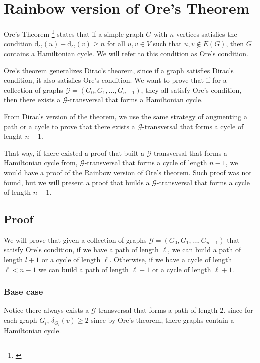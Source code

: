 
\chapter{Rainbow version of Ore's Theorem}

Ore's Theorem \footnote{\cite{Ore_1960}} states that if a simple graph $G$ with $n$ vertices satisfies the condition
$\text{d}_G(u) + \text{d}_G(v) \geq n$ for all $u, v \in V$ such that ${u, v} \not\in E(G)$, then $G$ contains a Hamiltonian cycle.
We will refer to this condition as Ore's condition.

Ore's theorem generalizes Dirac's theorem, since if a graph satisfies Dirac's condition, it also satisfies Ore's condition.
We want to prove that if for a collection of graphs $\mathcal{G} = (G_0, G_1, \ldots, G_{n-1})$, they all satisfy Ore's condition,
then there exists a $\mathcal{G}$-transversal that forms a Hamiltonian cycle.

From Dirac's version of the theorem, we use the same strategy of augmenting a path or a cycle   
to prove that there exists a $\mathcal{G}$-transversal that forms a cycle of lenght $n - 1$.

That way, if there existed a proof that built a 
$\mathcal{G}$-transversal that forms a Hamiltonian cycle from, 
$\mathcal{G}$-transversal that forms a cycle of length $n - 1$, 
we would have a proof of the Rainbow version of Ore's theorem.
Such proof was not found,
but we will present a proof that builds a $\mathcal{G}$-transversal 
that forms a cycle of length $n - 1$.


\section{Proof}

We will prove that given a collection of graphs $\mathcal{G} = (G_0, G_1, \ldots, G_{n-1})$ 
that satisfy Ore's condition,
if we have a path of length $\ell$, we can build a path of length $l + 1$  or 
a cycle of length $\ell$.
Otherwise, if we have a cycle of length $\ell < n - 1$ 
we can build a path of length $\ell + 1$ or a cycle of length $\ell + 1$.

\subsection{Base case}

Notice there always exists a $\mathcal{G}$-transversal that forms a path of length $2$.
since for each graph $G_i$, $\delta_{G_i}(v) \geq 2$ since by Ore's theorem,
there graphs contain a Hamiltonian cycle. 

